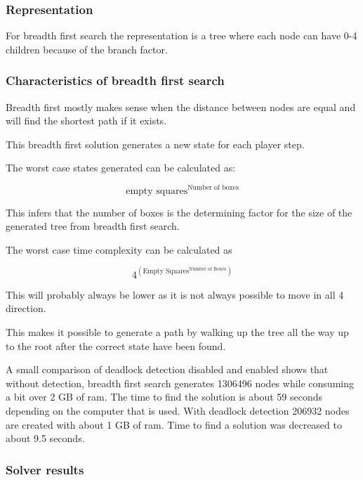 \documentclass[../../main.tex]{subfiles}
\begin{document}
\subsubsection{Representation}

For breadth first search the representation is a tree where each node can have 0-4 children because of the branch factor.

\subsubsection{Characteristics of breadth first search}

Breadth first mostly makes sense when the distance between nodes are equal and
will find the shortest path if it exists.

This breadth first solution generates a new state for each player step.

The worst case states generated can be calculated as:

\begin{equation}
	\textrm{empty squares}^{ \textrm{Number of boxes}}
\end{equation}

This infers that the number of boxes is the determining factor for the size
of the generated tree from breadth first search.

The worst case time complexity can be calculated as

\begin{equation}
	4^{  \left(  \textrm{Empty Squares} ^{ \textrm{Number of Boxes}}  \right)   }
\end{equation}

This will probably always be lower as it is not always possible to move in all 4 direction.

This makes it possible to generate a path by walking up the tree all the way up to the root after the correct state have 	been found.

A small comparison of deadlock detection disabled and enabled shows that without detection, breadth first search generates 1306496 nodes while consuming a bit over 2 GB of ram. The time to find the solution is about 59 seconds depending on the computer that is used.
With deadlock detection 206932 nodes are created with about 1 GB of ram. Time to find a solution was decreased to about 9.5 seconds.

\subsubsection{Solver results}
\end{document}
